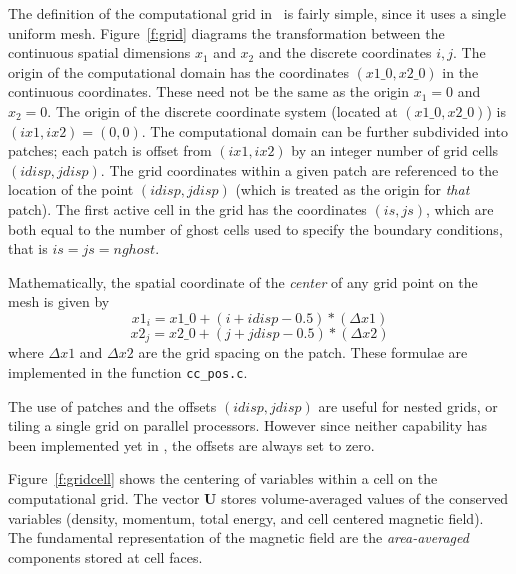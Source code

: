 The definition of the computational grid in \ath\ is fairly simple, since it
uses a single uniform mesh.  Figure~\ref{f:grid} diagrams the transformation
between the continuous spatial dimensions $x_{1}$ and $x_{2}$ and the discrete
coordinates $i,j$.  The origin of the computational domain has the coordinates
$(x1\_0, x2\_0)$ in the continuous coordinates.  These need not be the same
as the origin $x_{1}=0$ and $x_{2}=0$.  The origin of the discrete
coordinate system (located at $(x1\_0, x2\_0)$) is $(ix1, ix2) = (0,0)$.
The computational domain can be further subdivided into patches; each patch
is offset from $(ix1, ix2)$ by an integer number of grid cells $(idisp, jdisp)$.
The grid coordinates within a given patch are referenced to the location
of the point $(idisp, jdisp)$ (which is treated as the origin for {\em that}
patch).  The first active cell in the grid has the coordinates $(is,js)$,
which are both equal to the number of ghost cells used to specify the 
boundary conditions, that is $is=js=nghost$. 


Mathematically, the spatial coordinate of the {\em center} of any grid point
on the mesh is given by
\begin{displaymath}
  x1_{i} = x1\_0 + (i + idisp - 0.5)*(\Delta x1)
\end{displaymath}
\begin{displaymath}
  x2_{j} = x2\_0 + (j + jdisp - 0.5)*(\Delta x2)
\end{displaymath}
where $\Delta x1$ and $\Delta x2$ are the grid spacing on the patch.
These formulae are implemented in the function {\tt cc\_pos.c}.

The use of patches and the offsets $(idisp, jdisp)$ are useful for
nested grids, or tiling a single grid on parallel processors.  However since
neither capability has been implemented yet in \ath, the offsets are always
set to zero.

Figure~\ref{f:gridcell} shows the centering of variables within a cell
on the computational grid.  The vector {\bf U} stores volume-averaged
values of the conserved variables (density, momentum, total energy, and
cell centered magnetic field).  The fundamental representation of the
magnetic field are the {\em area-averaged} components stored at cell faces. 

